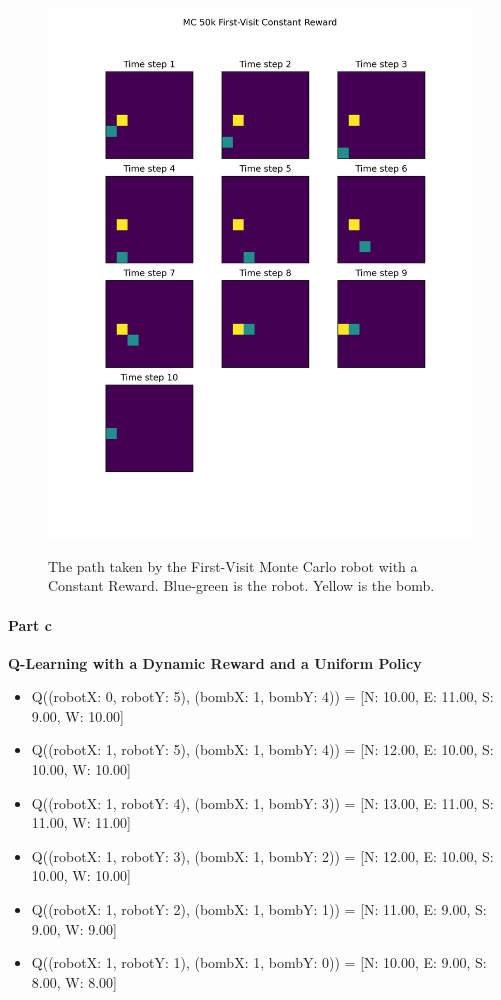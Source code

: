 \documentclass[12pt]{article}
\begin{document}
\begin{figure}
  \includegraphics[width=0.95\linewidth]{Figures/mc-50k-first-visit-constant-reward.png}
  \centering
  \label{fig:mcc}
  \caption{The path taken by the First-Visit Monte Carlo robot with a Constant Reward. Blue-green is the robot. Yellow is the bomb.}
\end{figure}

\paragraph{Part c}

\textbf{Q-Learning with a Dynamic Reward and a Uniform Policy}
\begin{itemize}
  \item Q((robotX: 0, robotY: 5), (bombX: 1, bombY: 4)) = [N: 10.00, E: 11.00, S: 9.00, W: 10.00]
  \item Q((robotX: 1, robotY: 5), (bombX: 1, bombY: 4)) = [N: 12.00, E: 10.00, S: 10.00, W: 10.00]
  \item Q((robotX: 1, robotY: 4), (bombX: 1, bombY: 3)) = [N: 13.00, E: 11.00, S: 11.00, W: 11.00]
  \item Q((robotX: 1, robotY: 3), (bombX: 1, bombY: 2)) = [N: 12.00, E: 10.00, S: 10.00, W: 10.00]
  \item Q((robotX: 1, robotY: 2), (bombX: 1, bombY: 1)) = [N: 11.00, E: 9.00, S: 9.00, W: 9.00]
  \item Q((robotX: 1, robotY: 1), (bombX: 1, bombY: 0)) = [N: 10.00, E: 9.00, S: 8.00, W: 8.00]
\end{itemize}
\end{document}
